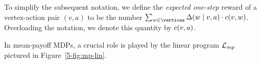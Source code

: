 




To simplify the subsequent notation, we define the \emph{expected one-step} reward of a vertex-action pair $(v,a)$ to be the number $\sum_{w\in \vertices} \probTranFunc(w\mid v,a)\cdot \colouring(v,w)$. Overloading the notation, we denote this quantity by $c(v,a)$.

In mean-payoff  MDPs, a crucial role is played by the linear program $\mathcal{L}_{\mathit{mp}}$ pictured in Figure~\ref{5-fig:mp-lin}.

